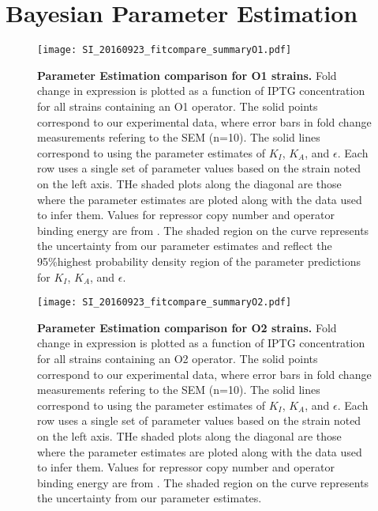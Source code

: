 \section{Bayesian Parameter Estimation} \label{AppendixParamEstimation}

\begin{figure}[h]
	\centering \texttt{[image: SI\_20160923\_fitcompare\_summaryO1.pdf]}
	\caption{{\bf Parameter Estimation comparison for O1 strains.} Fold change in expression is plotted as a function of IPTG concentration for all strains containing an O1 operator. The solid points correspond to our experimental data, where error bars in fold change measurements refering to the SEM (n=10). The solid lines correspond to \eref[eq7] using the parameter estimates of $K_I$, $K_A$, and $\epsilon$. Each row uses a single set of parameter values based on the strain noted on the left axis. THe shaded plots along the diagonal are those where the parameter estimates are ploted along with the data used to infer them. Values for repressor copy number and operator binding energy are from \cite{Garcia2011}.  The shaded region on the curve represents the uncertainty from our parameter estimates and reflect the 95\%highest probability density region of the parameter predictions for $K_I$, $K_A$, and $\epsilon$.}
	\label{SIfig7}
\end{figure}

\begin{figure}[h]
	\centering \texttt{[image: SI\_20160923\_fitcompare\_summaryO2.pdf]}
	\caption{{\bf Parameter Estimation comparison for O2 strains.} Fold change in expression is plotted as a function of IPTG concentration for all strains containing an O2 operator. The solid points correspond to our experimental data, where error bars in fold change measurements refering to the SEM (n=10). The solid lines correspond to \eref[eq7] using the parameter estimates of $K_I$, $K_A$, and $\epsilon$. Each row uses a single set of parameter values based on the strain noted on the left axis. THe shaded plots along the diagonal are those where the parameter estimates are ploted along with the data used to infer them. Values for repressor copy number and operator binding energy are from \cite{Garcia2011}.  The shaded region on the curve represents the uncertainty from our parameter estimates.}
	\label{SIfig8}
\end{figure}

